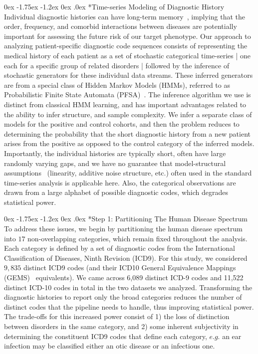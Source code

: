 \documentclass[onecolumn, compsoc,11pt]{IEEEtran}
\makeatletter
\renewcommand\subsection{\@startsection {subsection}{2}{\z@}%
                                   {0ex \@plus -1.75ex \@minus -1.2ex}%
                                   {0ex \@plus.0ex}%
                                   {\fontsize{11}{11}\selectfont\bfseries\sffamily\color{black}}}
\def\treatment{positive\xspace}
\makeatother
\begin{document}
\subsection*{Time-series Modeling of  Diagnostic History}
Individual diagnostic histories  can have long-term memory~\cite{ltgranger80}, implying that the order, frequency, and comorbid interactions between diseases are potentially  important for assessing the future risk of our target phenotype. 
Our  approach to analyzing patient-specific  diagnostic code sequences consists of representing the medical history of each patient as a set of stochastic categorical time-series | one each for a specific group of related disorders |  followed by the inference of stochastic generators  for  these individual data streams. These inferred generators are from a special class of  Hidden Markov Models (HMMs), referred to as Probabilistic Finite State Automata (PFSA)~\cite{CL12g}. The inference algorithm we use is distinct from classical HMM learning, and has important advantages related to the ability to infer structure, and sample complexity. We infer a separate class of models for the \treatment and control cohorts, and then the problem reduces to determining the probability that the short diagnostic history from a  new  patient arises from the \treatment as opposed to the control category of the inferred models. Importantly,  the individual histories are typically short, often have large randomly varying  gaps, and we have no guarantee that model-structural assumptions~\cite{Stoyanov2010,Shumway2000} (linearity, additive noise structure, etc.)  often used in the standard time-series analysis is applicable here. Also, the categorical observations are drawn  from a large alphabet of possible  diagnostic codes, which degrades  statistical power. 

\subsection*{Step 1: Partitioning The Human Disease Spectrum} To address these issues, we begin by partitioning the human disease spectrum into  $17$ non-overlapping  categories, which remain fixed throughout the analysis. Each category is defined by a set of diagnostic codes from the International Classification of Diseases, Ninth Revision (ICD9).
For this study, we considered $9,835$ distinct ICD9 codes (and their ICD10 General Equivalence Mappings (GEMS)~\cite{GEMS} equivalents). We came across 6,089 distinct ICD-9 codes and 11,522 distinct ICD-10 codes in total in the two datasets we analyzed. Transforming the diagnostic histories to report only the broad categories   reduces the number of distinct codes that the pipeline needs to handle, thus improving statistical  power.  The trade-offs for this increased power consist of 1) the loss of distinction between disorders in the same category, and  2) some inherent subjectivity in determining the constituent ICD9 codes that define each category, $e.g.$ an ear infection may be classified either an otic disease or an infectious one.
\end{document}
